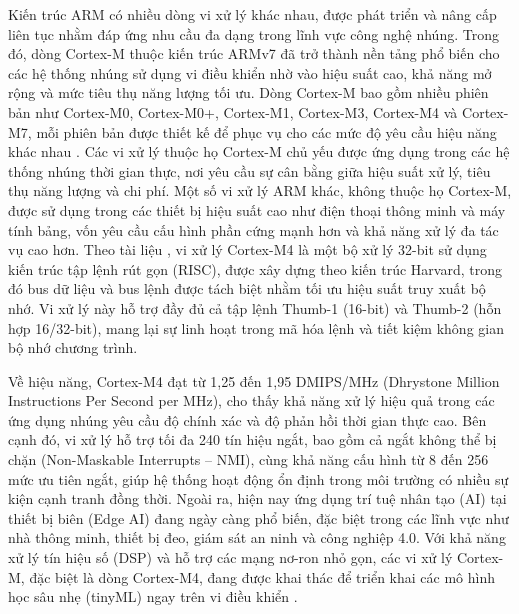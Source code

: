 Kiến trúc ARM có nhiều dòng vi xử lý khác nhau, được phát triển và nâng
cấp liên tục nhằm đáp ứng nhu cầu đa dạng trong lĩnh vực công nghệ nhúng. 
Trong đó, dòng Cortex-M thuộc kiến trúc ARMv7 đã trở thành nền tảng phổ 
biến cho các hệ thống nhúng sử dụng vi điều khiển nhờ vào hiệu suất cao, 
khả năng mở rộng và mức tiêu thụ năng lượng tối ưu. Dòng Cortex-M bao 
gồm nhiều phiên bản như Cortex-M0, Cortex-M0+, Cortex-M1, Cortex-M3, 
Cortex-M4 và Cortex-M7, mỗi phiên bản được thiết kế để phục vụ cho các mức 
độ yêu cầu hiệu năng khác nhau \cite{arm_cortex_m_comparison}. 
Các vi xử lý thuộc họ Cortex-M chủ yếu được ứng dụng trong các hệ thống 
nhúng thời gian thực, nơi yêu cầu sự cân bằng giữa hiệu suất xử lý, tiêu 
thụ năng lượng và chi phí. Một số vi xử lý ARM khác, không thuộc họ 
Cortex-M, được sử dụng trong các thiết bị hiệu suất cao như điện thoại 
thông minh và máy tính bảng, vốn yêu cầu cấu hình phần cứng mạnh hơn và 
khả năng xử lý đa tác vụ cao hơn.
Theo tài liệu \cite{cortexM4}, vi xử lý Cortex-M4 là một bộ xử lý 32-bit 
sử dụng kiến trúc tập lệnh rút gọn (RISC), được xây dựng theo kiến trúc 
Harvard, trong đó bus dữ liệu và bus lệnh được tách biệt nhằm tối ưu 
hiệu suất truy xuất bộ nhớ. Vi xử lý này hỗ trợ đầy đủ cả tập lệnh 
Thumb-1 (16-bit) và Thumb-2 (hỗn hợp 16/32-bit), mang lại sự linh hoạt 
trong mã hóa lệnh và tiết kiệm không gian bộ nhớ chương trình.

Về hiệu năng, Cortex-M4 đạt từ 1,25 đến 1,95 DMIPS/MHz (Dhrystone Million Instructions Per Second per MHz), cho thấy khả năng xử lý hiệu quả trong các ứng dụng nhúng yêu cầu độ chính xác và độ phản hồi thời gian thực cao. Bên cạnh đó, vi xử lý hỗ trợ tối đa 240 tín hiệu ngắt, bao gồm cả ngắt không thể bị chặn (Non-Maskable Interrupts – NMI), cùng khả năng cấu hình từ 8 đến 256 mức ưu tiên ngắt, giúp hệ thống hoạt động ổn định trong môi trường có nhiều sự kiện cạnh tranh đồng thời.
Ngoài ra, hiện nay ứng dụng trí tuệ nhân tạo (AI) tại thiết bị biên (Edge AI) đang ngày càng phổ biến, đặc biệt trong các lĩnh vực như nhà thông minh, thiết bị đeo, giám sát an ninh và công nghiệp 4.0. Với khả năng xử lý tín hiệu số (DSP) và hỗ trợ các mạng nơ-ron nhỏ gọn, các vi xử lý Cortex-M, đặc biệt là dòng Cortex-M4, đang được khai thác để triển khai các mô hình học sâu nhẹ (tinyML) ngay trên vi điều khiển \cite{electronics11162545}\cite{applicationCortexM4}.


